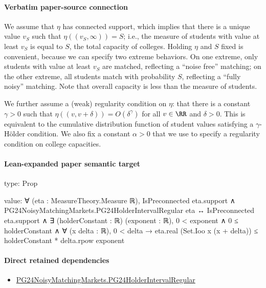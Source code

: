 \documentclass[10pt]{article}
\begin{document}
\paragraph{Verbatim paper-source connection}
\begin{ReviewVerbatim}
We assume that $\eta$ has connected support, which implies that there is a unique value $v_S$ such that $\eta((v_S, \infty))=S$; i.e., the measure of students with value at least $v_S$ is equal to $S$, the total capacity of colleges. Holding $\eta$ and $S$ fixed is convenient, because we can specify two extreme behaviors. On one extreme, only students with value at least $v_S$ are matched, reflecting a ``noise free'' matching; on the other extreme, all students match with probability $S$, reflecting a ``fully noisy'' matching. Note that overall capacity is less than the measure of students.

We further assume a (weak) regularity condition on $\eta$: that there is a constant $\gamma>0$ such that $\eta((v, v+\delta)) = O(\delta^\gamma)$ for all $v\in \RR$ and $\delta > 0.$ This is equivalent to the cumulative distribution function of student values satisfying a $\gamma$-Hölder condition. We also fix a constant $\alpha>0$ that we use to specify a regularity condition on college capacities.
\end{ReviewVerbatim}



\paragraph{Lean-expanded paper semantic target}
\begin{ReviewVerbatim}
type:
Prop

value:
∀ (eta : MeasureTheory.Measure ℝ),
  IsPreconnected eta.support ∧ PG24NoisyMatchingMarkets.PG24HolderIntervalRegular eta ↔
    IsPreconnected eta.support ∧
      ∃ (holderConstant : ℝ) (exponent : ℝ),
        0 < exponent ∧
          0 ≤ holderConstant ∧
            ∀ (x delta : ℝ), 0 < delta → eta.real (Set.Ioo x (x + delta)) ≤ holderConstant * delta.rpow exponent
\end{ReviewVerbatim}

\paragraph{Direct retained dependencies}
\begin{itemize}\raggedright
\item \hyperlink{governing-declaration-34ba25842cf90e86}{PG24\allowbreak{}Noisy\allowbreak{}Matching\allowbreak{}Markets.\allowbreak{}PG24\allowbreak{}Holder\allowbreak{}Interval\allowbreak{}Regular}
\end{itemize}
\end{document}
